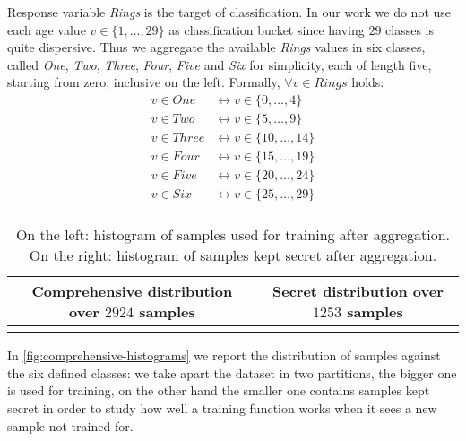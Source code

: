 \documentclass[10pt,a4paper]{article}
\begin{document}
    Response variable \emph{Rings} is the target of classification. 
    In our work we do not use each age value $v \in \lbrace 1, \ldots, 29 \rbrace$ 
    as classification bucket since having $29$ classes is quite dispersive.
    Thus we aggregate the available \emph{Rings} values in six classes, called \emph{One},
    \emph{Two}, \emph{Three}, \emph{Four}, \emph{Five} and \emph{Six} for simplicity, each of length five, 
    starting from zero, inclusive on the left. Formally, $\forall v \in Rings$ holds: 
    \begin{displaymath}
        \begin{split}
                v \in One &\leftrightarrow v \in \lbrace 0, \ldots, 4 \rbrace \\
                v \in Two &\leftrightarrow v \in \lbrace 5, \ldots, 9 \rbrace \\
                v \in Three &\leftrightarrow v \in \lbrace 10, \ldots, 14 \rbrace \\
                v \in Four &\leftrightarrow v \in \lbrace 15, \ldots, 19 \rbrace \\
                v \in Five &\leftrightarrow v \in \lbrace 20, \ldots, 24 \rbrace \\
                v \in Six &\leftrightarrow v \in \lbrace 25, \ldots, 29 \rbrace \\
        \end{split}
    \end{displaymath}

    \begin{table}
        \begin{tabular}{ c | c }
            Comprehensive distribution over $2924$ samples  &   Secret distribution over $1253$ samples \\
            \hline 
             &  \\
            \hline
        \end{tabular}
      \caption{On the left: histogram of samples used for training after aggregation.
        On the right: histogram of samples kept secret after aggregation.}
      \label{fig:comprehensive-histograms}
    \end{table}

    In \autoref{fig:comprehensive-histograms} we report the distribution of samples against
    the six defined classes: we take apart the dataset in two partitions, the bigger one is
    used for training, on the other hand the smaller one contains samples kept secret
    in order to study how well a training function works when it sees a new sample not
    trained for.
\end{document}
